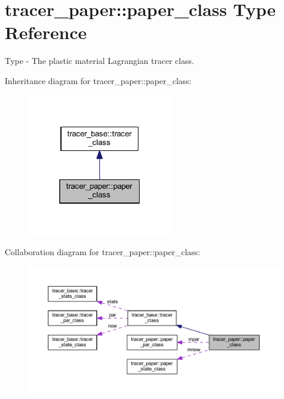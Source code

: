 \hypertarget{structtracer__paper_1_1paper__class}{}\section{tracer\+\_\+paper\+:\+:paper\+\_\+class Type Reference}
\label{structtracer__paper_1_1paper__class}


Type -\/ The plastic material Lagrangian tracer class.  




Inheritance diagram for tracer\+\_\+paper\+:\+:paper\+\_\+class\+:
\nopagebreak
\begin{figure}[H]
\begin{center}
\leavevmode
\includegraphics[width=181pt]{structtracer__paper_1_1paper__class__inherit__graph}
\end{center}
\end{figure}


Collaboration diagram for tracer\+\_\+paper\+:\+:paper\+\_\+class\+:
\nopagebreak
\begin{figure}[H]
\begin{center}
\leavevmode
\includegraphics[width=350pt]{structtracer__paper_1_1paper__class__coll__graph}
\end{center}
\end{figure}
